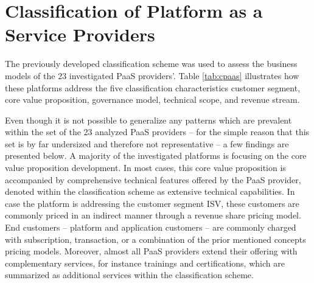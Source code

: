 

\section{Classification of Platform as a Service Providers}\label{ch:sota:cPaaS}

The previously developed classification scheme was used to assess the business models of the 23 investigated \ac{PaaS} providers'. Table \ref{tab:cpaas} illustrates how these platforms address the five classification characteristics customer segment, core value proposition, governance model, technical scope, and revenue stream. 

Even though it is not possible to generalize any patterns which are prevalent within the set of the 23 analyzed \ac{PaaS} providers -- for the simple reason that this set is by far undersized and therefore not representative -- a few findings are presented below. A majority of the investigated platforms is focusing on the core value proposition development. In most cases, this core value proposition is accompanied by comprehensive technical features offered by the \ac{PaaS} provider, denoted within the classification scheme as extensive technical capabilities. In case the platform is addressing the customer segment \ac{ISV}, these customers are commonly priced in an indirect manner through a revenue share pricing model. End customers -- platform and application customers -- are commonly charged with subscription, transaction, or a combination of the prior mentioned concepts pricing models. Moreover, almost all \ac{PaaS} providers extend their offering with complementary services, for instance trainings and certifications, which are summarized as additional services within the classification scheme.


